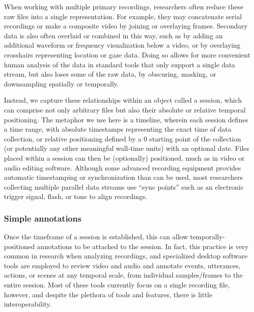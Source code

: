 \documentclass{sig-alternate}
\begin{document}
When working with multiple primary recordings, researchers often reduce these raw files into a single representation.
For example, they may concatenate serial recordings or make a composite video by joining or overlaying frames.
Secondary data is also often overlaid or combined in this way, such as by adding an additional waveform or frequency visualization below a video, or by overlaying crosshairs representing location or gaze data.
Doing so allows for more convenient human analysis of the data in standard tools that only support a single data stream, but also loses some of the raw data, by obscuring, masking, or downsampling spatially or temporally.

Instead, we capture these relationships within an object called a session, which can comprise not only arbitrary files but also their absolute or relative temporal positioning.
The metaphor we use here is a timeline, wherein each session defines a time range, with absolute timestamps representing the exact time of data collection, or relative positioning defined by a 0 starting point of the collection (or potentially any other meaningful wall-time units) with an optional date.
Files placed within a session can then be (optionally) positioned, much as in video or audio editing software.
Although some advanced recording equipment provides automatic timestamping or synchronization than can be used, most researchers collecting multiple parallel data streams use ``sync points'' such as an electronic trigger signal, flash, or tone to align recordings.

\subsubsection{Simple annotations}

Once the timeframe of a session is established, this can allow temporally-positioned annotations to be attached to the session.
In fact, this practice is very common in research when analyzing recordings, and specialized desktop software tools are employed to review video and audio and annotate events, utterances, actions, or scenes at any temporal scale, from individual samples/frames to the entire session.
Most of these tools currently focus on a single recording file, however, and despite the plethora of tools and features, there is little interoperability.
\end{document}
